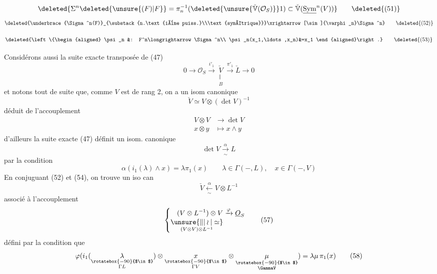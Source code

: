 \[
\deleted{\Sigma^n\deleted{\unsure{(F)|F}}=\pi_n^{-1}(\deleted{\unsure{\check{\mathbb V}(\mathcal O_S)}}1)\subset\check{\mathbb V}(\underline{\mathrm{Sym}}^n(V))} \tag*{\deleted{(51)}}
\]
\[
\deleted{\underbrace{\Sigma^n(F)}_{\substack{n.\text{ième puiss.}\\\text{symétrique}}}\xrightarrow[\sim]{\varphi_n}\Sigma^n} \tag*{\deleted{(52)}}
\]

\[
\deleted{\left\{\begin{aligned}
 \psi_n &: F^n\longrightarrow\Sigma^n\\
 \psi_n(x_1,\ldots,x_n)&=x_1
\end{aligned}\right.} \tag*{\deleted{(53)}}
\]

Considérons aussi la suite exacte transposée de (47)
\[
0\longrightarrow\mathcal O_S\xrightarrow{i'_1}\underset{\substack{\Vert\\ B}}{\check V}\xrightarrow{\pi'_1}\check L\longrightarrow0 \tag*{(51)}
\]
et notons tout de suite que, comme $V$ est
de rang 2, on a un isom canonique
\[
\check V\simeq V\otimes(\det V)^{-1} \tag*{(52)}
\]
déduit de l'accouplement  
\[
\begin{aligned} V\otimes V&\longrightarrow\det V\\ x\otimes y&\longmapsto x\wedge y\end{aligned} \tag*{(53)}
\]
d'ailleurs la suite exacte (47) définit un
isom. canonique
\[
\det V\xrightarrow[\sim]{\alpha}L \tag*{(54)}
\]
 par la condition
\[
\alpha(i_1(\lambda)\wedge x)=\lambda\pi_1(x)\qquad\lambda\in\Gamma(-,L),\quad x\in\Gamma(-,V) \tag*{(55)}
\]
En conjuguant (52) et (54), on trouve un
iso can
\[
\check V\xleftarrow[\sim]{\alpha}V\otimes L^{-1} \tag*{(56)}
\]
 associé à l'accouplement 
\[
\left\{\begin{aligned}
(V\otimes L^{-1})\otimes V&\xrightarrow{\varphi}\underline O_S\\[-2pt]
\underset{(V\otimes V)\otimes L^{-1}}{\unsure{\Vert|\wr|\simeq}}&
\end{aligned}\right. \tag*{(57)}
\]
défini par la condition que
\[
\varphi(i_1(\underset{\substack{\rotatebox{-90}{$\in$}\\\Gamma L}}{\lambda})\otimes\underset{\substack{\rotatebox{-90}{$\in$}\\\Gamma V}}{x}\otimes\underset{\substack{\rotatebox{-90}{$\in$}\\\GammaV}}{\mu})=\lambda\mu\,\pi_1(x) \tag*{(58)}
\]

